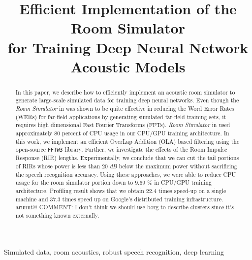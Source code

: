 \documentclass{article}
\title{Efficient Implementation of the Room Simulator \\ for Training Deep Neural Network Acoustic Models}
\makeatletter
\newcommand{\AR}[1]{{\color{red} arunnt@ COMMENT: #1}}
\makeatother
\begin{document}
%
\maketitle
%
\begin{abstract}
In this paper, we describe how to efficiently implement
an acoustic room simulator to generate large-scale
simulated data for training deep neural networks.
Even though the \textit{Room Simulator} in \cite{C_Kim_INTERSPEECH_2017_1} was shown
 to be quite effective in reducing the Word
Error Rates (WERs) for far-field applications by generating
simulated far-field training sets, it requires
high dimensional Fast Fourier Transforms (FFTs).
\textit{Room Simulator} in \cite{C_Kim_INTERSPEECH_2017_1} used 
  approximately 80 percent of CPU usage in our CPU/GPU
training architecture. In this work, we implement an efficient OverLap
  Addition (OLA) based filtering using the open-source \texttt{FFTW3}
library. Further, we investigate the effects of the Room
Impulse Response (RIR) lengths. Experimentally, we conclude that we can cut
the tail portions of RIRs whose power is less than 20 \textit{dB}
below the maximum power without sacrificing the speech recognition accuracy.
Using these approaches, we were able to reduce CPU usage for the
room simulator portion down to 9.69 \%
in CPU/GPU training architecture. Profiling result shows that
we obtain 22.4 times speed-up on a single machine and 37.3 times
  speed up on Google's distributed training infrastructure.
\AR{I don't think we should use borg to describe clusters since it's not something known externally.}
 \end{abstract}
%
\begin{keywords}
Simulated data, room acoustics, robust speech recognition, deep learning
\end{keywords}
%
%
\end{document}
